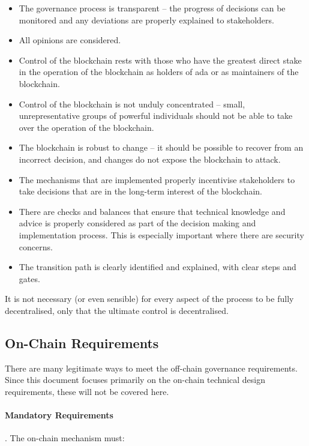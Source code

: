 \begin{itemize}
\item
  The governance process is transparent -- the progress of decisions can be monitored and any deviations are properly explained to stakeholders.
\item
  All opinions are considered.
\item
  Control of the blockchain rests with those who have the greatest direct stake in the operation of the blockchain as holders of ada or as maintainers of the blockchain.
\item
  Control of the blockchain is not unduly concentrated -- small, unrepresentative groups of powerful individuals should not be able to take over the operation
  of the blockchain.
\item
  The blockchain is robust to change -- it should be possible to recover from an incorrect decision, and changes do not expose the blockchain to attack.
\item
  The mechanisms that are implemented properly incentivise stakeholders to take decisions that are in the long-term interest of the blockchain.
\item
  There are checks and balances that ensure that technical knowledge and advice is properly considered as part of the decision making and implementation process.
  This is especially important where there are security concerns.
\item
  The transition path is clearly identified and explained, with clear steps and gates.
\end{itemize}


It is not necessary (or even sensible) for every aspect of the process to be fully decentralised, only that the ultimate control is decentralised.

\subsection{On-Chain Requirements}

There are many legitimate ways to meet the off-chain governance requirements.  Since this document focuses primarily on the on-chain technical design requirements, these will not be covered here.

\paragraph{Mandatory Requirements}.  The on-chain mechanism must:

